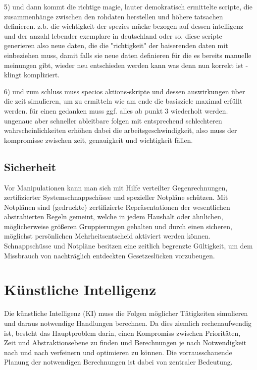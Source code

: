 5) und dann kommt die richtige magie, lauter demokratisch ermittelte scripte, die zusammenhänge zwischen den rohdaten herstellen und höhere tatsachen definieren. z.b. die wichtigkeit der spezies mücke bezogen auf dessen intelligenz und der anzahl lebender exemplare in deutschland oder so. diese scripte generieren also neue daten, die die "richtigkeit" der baiserenden daten mit einbeziehen muss, damit falls sie neue daten definieren für die es bereits manuelle meinungen gibt, wieder neu entschieden werden kann was denn nun korrekt ist - klingt kompliziert.

6) und zum schluss muss specios aktions-skripte und dessen auswirkungen über die zeit simulieren, um zu ermitteln wie am ende die basisziele maximal erfüllt werden. für einen gedanken muss ggf. alles ab punkt 3 wiederholt werden. ungenaue aber schneller ableitbare folgen mit entsprechend schlechteren wahrscheinlichkeiten erhöhen dabei die arbeitsgeschwindigkeit, also muss der kompromisse zwischen zeit, genauigkeit und wichtigkeit fällen.

\subsection{Sicherheit}\label{sec:maintenance/security}

Vor Manipulationen kann man sich mit Hilfe verteilter Gegenrechnungen, zertifizierter Systemschnappschüsse und spezieller Notpläne schützen. Mit Notplänen sind (gedruckte) zertifizierte Repräsentationen der wesentlichen abstrahierten Regeln gemeint, welche in jedem Haushalt oder ähnlichen, möglicherweise größeren Gruppierungen gehalten und durch einen sicheren, möglichst persönlichen Mehrheitsentscheid aktiviert werden können. Schnappschüsse und Notpläne besitzen eine zeitlich begrenzte Gültigkeit, um dem Missbrauch von nachträglich entdeckten Gesetzeslücken vorzubeugen.

\section{Künstliche Intelligenz}\label{sec:ki}

Die künstliche Intelligenz (KI) muss die Folgen möglicher Tätigkeiten simulieren und daraus notwendige Handlungen berechnen. Da dies ziemlich rechenaufwendig ist, besteht das Hauptproblem darin, einen Kompromiss zwischen Prioritäten, Zeit und Abstraktionsebene zu finden und Berechnungen je nach Notwendigkeit nach und nach verfeinern und optimieren zu können. Die vorrausschauende Planung der notwendigen Berechnungen ist dabei von zentraler Bedeutung.


